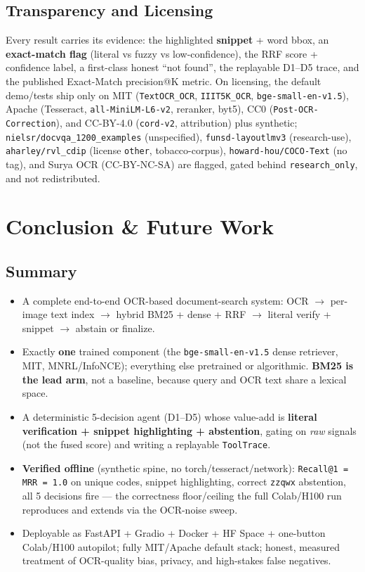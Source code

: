 \documentclass[12pt,a4paper]{article}
\begin{document}
\subsection{Transparency and Licensing}

Every result carries its evidence: the highlighted \textbf{snippet} + word bbox, an \textbf{exact-match flag} (literal vs fuzzy vs low-confidence), the RRF score + confidence label, a first-class honest ``not found'', the replayable D1--D5 trace, and the published Exact-Match precision@K metric. On licensing, the default demo/tests ship only on MIT (\texttt{TextOCR\_OCR}, \texttt{IIIT5K\_OCR}, \texttt{bge-small-en-v1.5}), Apache (Tesseract, \texttt{all-MiniLM-L6-v2}, reranker, byt5), CC0 (\texttt{Post-OCR-Correction}), and CC-BY-4.0 (\texttt{cord-v2}, attribution) plus synthetic; \texttt{nielsr/docvqa\_1200\_examples} (unspecified), \texttt{funsd-layoutlmv3} (research-use), \texttt{aharley/rvl\_cdip} (license \texttt{other}, tobacco-corpus), \texttt{howard-hou/COCO-Text} (no tag), and Surya OCR (CC-BY-NC-SA) are flagged, gated behind \texttt{research\_only}, and not redistributed.

\section{Conclusion \& Future Work}

\subsection{Summary}

\begin{itemize}\setlength\itemsep{0.12em}
  \item A complete end-to-end OCR-based document-search system: OCR $\rightarrow$ per-image text index $\rightarrow$ hybrid BM25 + dense + RRF $\rightarrow$ literal verify + snippet $\rightarrow$ abstain or finalize.
  \item Exactly \textbf{one} trained component (the \texttt{bge-small-en-v1.5} dense retriever, MIT, MNRL/InfoNCE); everything else pretrained or algorithmic. \textbf{BM25 is the lead arm}, not a baseline, because query and OCR text share a lexical space.
  \item A deterministic 5-decision agent (D1--D5) whose value-add is \textbf{literal verification + snippet highlighting + abstention}, gating on \emph{raw} signals (not the fused score) and writing a replayable \texttt{ToolTrace}.
  \item \textbf{Verified offline} (synthetic spine, no torch/tesseract/network): \texttt{Recall@1 = MRR = 1.0} on unique codes, snippet highlighting, correct \texttt{zzqwx} abstention, all 5 decisions fire --- the correctness floor/ceiling the full Colab/H100 run reproduces and extends via the OCR-noise sweep.
  \item Deployable as FastAPI + Gradio + Docker + HF Space + one-button Colab/H100 autopilot; fully MIT/Apache default stack; honest, measured treatment of OCR-quality bias, privacy, and high-stakes false negatives.
\end{itemize}
\end{document}
